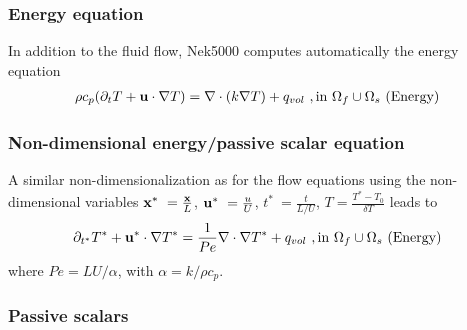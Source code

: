 
\subsubsection*{Energy equation}
In addition to the fluid flow, Nek5000 computes automatically the energy equation
\begin{eqnarray}\label{eq:energy}
 \rho c_{p} ( \partial_{t} T + {\bf u} \cdot \nabla T ) =
   \nabla \cdot (k \nabla T) + q_{vol}\,\, ,\text{in } \Omega_f\cup \Omega_s  \text{  (Energy)  } 
\end{eqnarray}

\subsubsection*{Non-dimensional energy/passive scalar equation}
A similar non-dimensionalization as for the flow equations using the non-dimensional variables
$\mathbf{x}^*\ = \frac{\mathbf{x}}{L}$,  $\mathbf{u}^*\ = \frac{u}{U}$, $t^*\ = \frac{t}{L/U}$, $T=\frac{T^*-T_0}{\delta T}$ leads to
\begin{eqnarray}\label{eq:energy_nondim}
\partial_{t^*} T^* + \mathbf{u}^* \cdot \nabla T^* =
  \frac{1}{Pe} \nabla \cdot \nabla T^* + q_{vol}\,\, ,\text{in } \Omega_f\cup \Omega_s  \text{  (Energy)  } 
\end{eqnarray}
where $Pe=LU/\alpha$, with $\alpha=k/\rho c_p$.


\subsubsection{Passive scalars}\label{sec:passive_scal}

